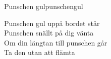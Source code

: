 \begin{song}{Punschen gul}{punschengul}
\begin{vers}
Punschen gul uppå bordet står\\
Punschen snällt på dig vänta\\
Om din längtan till punschen går\\
Ta den utan att flämta\\
\end{vers}
\end{song}
